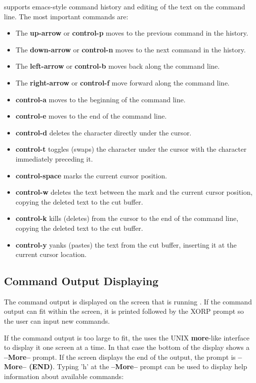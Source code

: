 \xorpsh supports emacs-style command history and editing of the text
on the command line.  The most important commands are:
\begin{itemize}
\item The {\bf up-arrow} or {\bf control-p} moves to the previous
command in the history.
\item The {\bf down-arrow} or {\bf control-n} moves to the next
command in the history.
\item The {\bf left-arrow} or {\bf control-b} moves back along the
command line.
\item The {\bf right-arrow} or {\bf control-f} move forward along the
command line.
\item {\bf control-a} moves to the beginning of the command line.
\item {\bf control-e} moves to the end of the command line.
\item {\bf control-d} deletes the character directly under the cursor.
\item {\bf control-t} toggles (swaps) the character under the cursor with
the character immediately preceding it.
\item {\bf control-space} marks the current cursor position.
\item {\bf control-w} deletes the text between the mark and the current
cursor position, copying the deleted text to the cut buffer.
\item {\bf control-k} kills (deletes) from the cursor to the end of the
command line, copying the deleted text to the cut buffer.
\item {\bf control-y} yanks (pastes) the text from the cut buffer,
inserting it at the
current cursor location.
\end{itemize}

\newpage
\subsection{Command Output Displaying}

The \xorpsh command output is displayed on the screen that is running
\xorpsh. If the command output can fit within the screen, it is printed
followed by the XORP prompt so the user can input new commands.

If the command output is too large to fit, the \xorpsh uses
the UNIX {\bf more}-like interface to display it one screen at a time.
In that case the bottom of the display shows a {\bf --More--} prompt.
If the screen displays the end of the output, the prompt
is {\bf --More-- (END)}.
Typing 'h' at the {\bf --More--} prompt can be used to display help
information about available commands:

